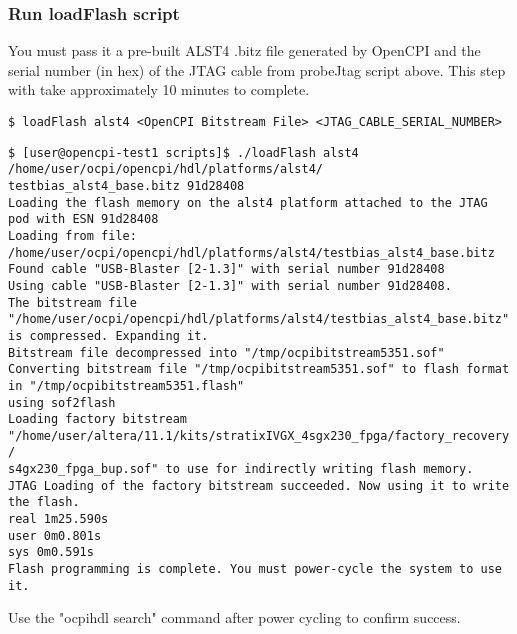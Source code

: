 \documentclass{article}
\newcommand{\shellcmd}[1]{\texttt{\$ #1\\}}
\newcommand{\terminaloutput}[1]{\texttt{#1}}
\begin{document}
\subsubsection*{Run loadFlash script}
You must pass it a pre-built ALST4 .bitz file generated by OpenCPI and the serial number (in hex) of the JTAG cable from probeJtag script above. This step with take approximately 10 minutes to complete.\par\bigskip
{}\par
\noindent\shellcmd{loadFlash alst4 <OpenCPI Bitstream File> <JTAG\_CABLE\_SERIAL\_NUMBER> }\par\smallskip
{}\par
\noindent\shellcmd{[user@opencpi-test1 scripts]\$ ./loadFlash alst4 /home/user/ocpi/opencpi/hdl/platforms/alst4\slash \\testbias\_alst4\_base.bitz 91d28408}
\terminaloutput{Loading the flash memory on the alst4 platform attached to the JTAG pod with ESN 91d28408\\
Loading from file: /home/user/ocpi/opencpi/hdl/platforms/alst4/testbias\_alst4\_base.bitz\\
Found cable "USB-Blaster [2-1.3]" with serial number 91d28408\\
Using cable "USB-Blaster [2-1.3]" with serial number 91d28408.\\
The bitstream file "/home/user/ocpi/opencpi/hdl/platforms/alst4/testbias\_alst4\_base.bitz" is compressed. Expanding it.\\
Bitstream file decompressed into "/tmp/ocpibitstream5351.sof"\\
Converting bitstream file "/tmp/ocpibitstream5351.sof" to flash format in "/tmp/ocpibitstream5351.flash" \\using sof2flash\\
Loading factory bitstream "/home/user/altera/11.1/kits/stratixIVGX\_4sgx230\_fpga/factory\_recovery\slash \\s4gx230\_fpga\_bup.sof" to use for indirectly writing flash memory.\\
JTAG Loading of the factory bitstream succeeded. Now using it to write the flash.\\
real	1m25.590s\\
user	0m0.801s\\
sys	0m0.591s\\
Flash programming is complete. You must power-cycle the system to use it.}\par\bigskip
\noindent Use the "ocpihdl search" command after power cycling to confirm success.\par
\end{document}
